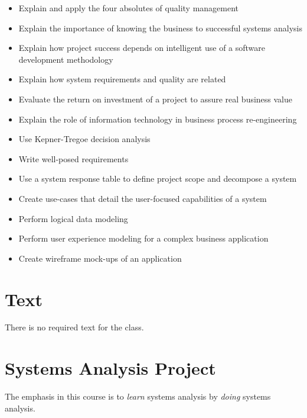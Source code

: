 \documentclass{article}
\begin{document}
\begin{itemize}
\item Explain and apply the four absolutes of quality management
\item Explain the importance of knowing the business to successful systems analysis
\item Explain how project success depends on intelligent use of a software development
methodology
\item Explain how system requirements and quality are related
\item Evaluate the return on investment of a project to assure real business value
\item Explain the role of information technology in business process re-engineering
\item Use Kepner-Tregoe decision analysis
\item Write well-posed requirements
\item Use a system response table to define project scope and decompose a system
\item Create use-cases that detail the user-focused capabilities of a system
\item Perform logical data modeling
\item Perform user experience modeling for a complex business application
\item Create wireframe mock-ups of an application
\end{itemize}

\section{Text}
\label{sec:orgheadline4}
There is no required text for the class.
\section{Systems Analysis Project}
\label{sec:orgheadline7}
The emphasis in this course is to \emph{learn} systems analysis by \emph{doing} systems analysis.
\end{document}
